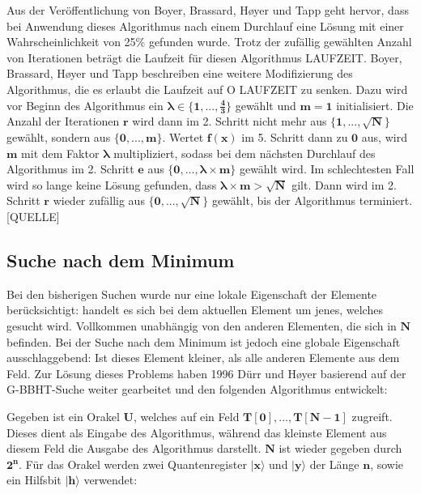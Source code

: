 Aus der Veröffentlichung von Boyer, Brassard, Høyer und Tapp geht hervor, dass bei Anwendung dieses Algorithmus nach einem Durchlauf eine Lösung mit einer Wahrscheinlichkeit von 25\% gefunden wurde. 
Trotz der zufällig gewählten Anzahl von Iterationen beträgt die Laufzeit für diesen Algorithmus LAUFZEIT.
Boyer, Brassard, Høyer und Tapp beschreiben eine weitere Modifizierung des Algorithmus, die es erlaubt die Laufzeit auf O LAUFZEIT zu senken. 
Dazu wird vor Beginn des Algorithmus ein $\mathbf{\pmb\lambda \in \{1, ..., \frac{4}{3} \} }$ gewählt und $\mathbf{m = 1}$ initialisiert. Die Anzahl der Iterationen $\mathbf{r}$ wird dann im 2. Schritt nicht mehr aus $\mathbf{\{1, ..., \sqrt{N}\}}$ gewählt, sondern aus $\mathbf{\{0, ..., m\}}$. 
Wertet $\mathbf{f(x)}$ im 5. Schritt dann zu $\mathbf{0}$ aus, wird $\mathbf{m}$ mit dem Faktor $\mathbf{\pmb\lambda}$ multipliziert, sodass bei dem nächsten Durchlauf des Algorithmus im 2. Schritt $\mathbf{e}$ aus $\mathbf{\{0, ..., \pmb\lambda \times m\}}$  gewählt wird. 
Im schlechtesten Fall wird so lange keine Lösung gefunden, dass $\mathbf{\pmb\lambda \times m > \sqrt{N}}$ gilt. Dann wird im 2. Schritt $\mathbf{r}$ wieder zufällig aus $\mathbf{\{0, ..., \sqrt{N}\}}$ gewählt, bis der Algorithmus terminiert. [QUELLE]


\subsection{Suche nach dem Minimum}
Bei den bisherigen Suchen wurde nur eine lokale Eigenschaft der Elemente berücksichtigt: handelt es sich bei dem aktuellen Element um jenes, welches gesucht wird. 
Vollkommen unabhängig von den anderen Elementen, die sich in $\mathbf{N}$ befinden. Bei der Suche nach dem Minimum ist jedoch eine globale Eigenschaft ausschlaggebend: Ist dieses Element kleiner, als alle anderen Elemente aus dem Feld.
Zur Lösung dieses Problems haben 1996 Dürr und Høyer basierend auf der G-BBHT-Suche weiter gearbeitet und den folgenden Algorithmus entwickelt: 

Gegeben ist ein Orakel $\mathbf{U}$, welches auf ein Feld $\mathbf{T[0], ..., T[N-1]}$ zugreift. 
Dieses dient als Eingabe des Algorithmus, während das kleinste Element aus diesem Feld die Ausgabe des Algorithmus darstellt. $\mathbf{N}$ ist wieder gegeben durch $\mathbf{2^n}$. 
Für das Orakel werden zwei Quantenregister $\mathbf{|x\rangle}$ und $\mathbf{|y\rangle}$ der Länge $\mathbf{n}$, sowie ein Hilfsbit $\mathbf{|h\rangle}$ verwendet:

